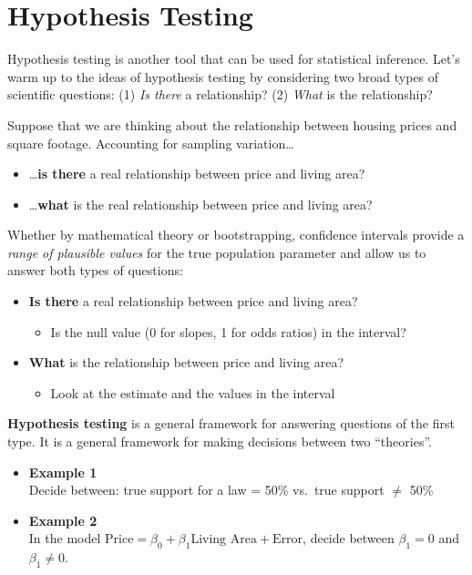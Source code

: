 \documentclass[
]{book}
\providecommand{\tightlist}{%
  \setlength{\itemsep}{0pt}\setlength{\parskip}{0pt}}
\begin{document}
\hypertarget{hypothesis-testing}{%
\section{Hypothesis Testing}\label{hypothesis-testing}}

Hypothesis testing is another tool that can be used for statistical inference. Let's warm up to the ideas of hypothesis testing by considering two broad types of scientific questions: (1) \emph{Is there} a relationship? (2) \emph{What} is the relationship?

Suppose that we are thinking about the relationship between housing prices and square footage. Accounting for sampling variation\ldots{}

\begin{itemize}
\tightlist
\item
  \ldots{}\textbf{is there} a real relationship between price and living area?
\item
  \ldots{}\textbf{what} is the real relationship between price and living area?
\end{itemize}

Whether by mathematical theory or bootstrapping, confidence intervals provide a \emph{range of plausible values} for the true population parameter and allow us to answer both types of questions:

\begin{itemize}
\tightlist
\item
  \textbf{Is there} a real relationship between price and living area?

  \begin{itemize}
  \tightlist
  \item
    Is the null value (0 for slopes, 1 for odds ratios) in the interval?
  \end{itemize}
\item
  \textbf{What} is the relationship between price and living area?

  \begin{itemize}
  \tightlist
  \item
    Look at the estimate and the values in the interval
  \end{itemize}
\end{itemize}

\textbf{Hypothesis testing} is a general framework for answering questions of the first type. It is a general framework for making decisions between two ``theories''.

\begin{itemize}
\item
  \textbf{Example 1}\\
  Decide between: true support for a law = 50\% vs.~true support \(\neq\) 50\%
\item
  \textbf{Example 2}\\
  In the model \(\text{Price} = \beta_0 + \beta_1\text{Living Area} + \text{Error}\), decide between \(\beta_1 = 0\) and \(\beta_1 \neq 0\).
\end{itemize}
\end{document}
